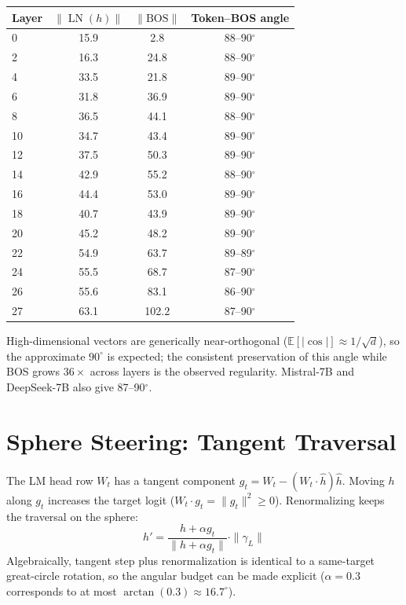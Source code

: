 \documentclass{article}
\begin{document}
\small
\begin{center}
\begin{tabular}{lccc}
\toprule
Layer & $\|\operatorname{LN}(h)\|$ & $\|\mathrm{BOS}\|$ & Token--BOS angle \\
\midrule
0  & 15.9 & 2.8  & 88--90$^\circ$ \\
2  & 16.3 & 24.8 & 88--90$^\circ$ \\
4  & 33.5 & 21.8 & 89--90$^\circ$ \\
6  & 31.8 & 36.9 & 89--90$^\circ$ \\
8  & 36.5 & 44.1 & 88--90$^\circ$ \\
10 & 34.7 & 43.4 & 89--90$^\circ$ \\
12 & 37.5 & 50.3 & 89--90$^\circ$ \\
14 & 42.9 & 55.2 & 88--90$^\circ$ \\
16 & 44.4 & 53.0 & 89--90$^\circ$ \\
18 & 40.7 & 43.9 & 89--90$^\circ$ \\
20 & 45.2 & 48.2 & 89--90$^\circ$ \\
22 & 54.9 & 63.7 & 89--89$^\circ$ \\
24 & 55.5 & 68.7 & 87--90$^\circ$ \\
26 & 55.6 & 83.1 & 86--90$^\circ$ \\
27 & 63.1 & 102.2 & 87--90$^\circ$ \\
\bottomrule
\end{tabular}
\end{center}
\normalsize

High-dimensional vectors are generically near-orthogonal ($\mathbb{E}[|\cos|]
\approx 1/\sqrt{d}$), so the approximate $90^\circ$ is expected; the consistent
preservation of this angle while BOS grows $36\times$ across layers is the
observed regularity. Mistral-7B and DeepSeek-7B also give 87--90$^\circ$.

\section{Sphere Steering: Tangent Traversal}

The LM head row $W_t$ has a tangent component $g_t = W_t - (W_t \cdot
\hat{h})\hat{h}$. Moving $h$ along $g_t$ increases the target logit ($W_t \cdot
g_t = \|g_t\|^2 \geq 0$). Renormalizing keeps the traversal on the sphere:
\[
h' = \frac{h + \alpha g_t}{\|h + \alpha g_t\|} \cdot \|\gamma_L\|
\]
Algebraically, tangent step plus renormalization is identical to a
same-target great-circle rotation, so the angular budget can be made explicit
($\alpha=0.3$ corresponds to at most $\arctan(0.3) \approx 16.7^\circ$).
\end{document}
